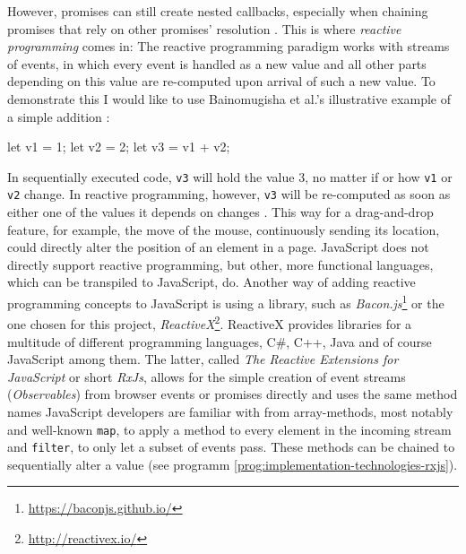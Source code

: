 However, promises can still create nested callbacks, especially when chaining promises that rely on other promises' resolution \cite{reactive-vs-promises}. This is where \emph{reactive programming} comes in: The reactive programming paradigm works with streams of events, in which every event is handled as a new value and all other parts depending on this value are re-computed upon arrival of such a new value. To demonstrate this I would like to use Bainomugisha et al.'s illustrative example of a simple addition \cite{reactive-programming-survey}:

\begin{JsCode}
let v1 = 1;
let v2 = 2;
let v3 = v1 + v2;
\end{JsCode}
%
In sequentially executed code, \texttt{v3} will hold the value $3$, no matter if or how \texttt{v1} or \texttt{v2} change. In reactive programming, however, \texttt{v3} will be re-computed as soon as either one of the values it depends on changes \cite{reactive-programming-survey}. This way for a drag-and-drop feature, for example, the move of the mouse, continuously sending its location, could directly alter the position of an element in a page. JavaScript does not directly support reactive programming, but other, more functional languages, which can be transpiled to JavaScript, do. Another way of adding reactive programming concepts to JavaScript is using a library, such as \emph{Bacon.js}\footnote{\url{https://baconjs.github.io/}} or the one chosen for this project, \emph{ReactiveX}\footnote{\url{http://reactivex.io/}}. ReactiveX provides libraries for a multitude of different programming languages, C#, C++, Java and of course JavaScript among them. The latter, called \emph{The Reactive Extensions for JavaScript} or short \emph{RxJs}, allows for the simple creation of event streams (\emph{Observables}) from browser events or promises directly and uses the same method names JavaScript developers are familiar with from array-methods, most notably and well-known \texttt{map}, to apply a method to every element in the incoming stream and \texttt{filter}, to only let a subset of events pass. These methods can be chained to sequentially alter a value (see programm \ref{prog:implementation-technologies-rxjs}).

